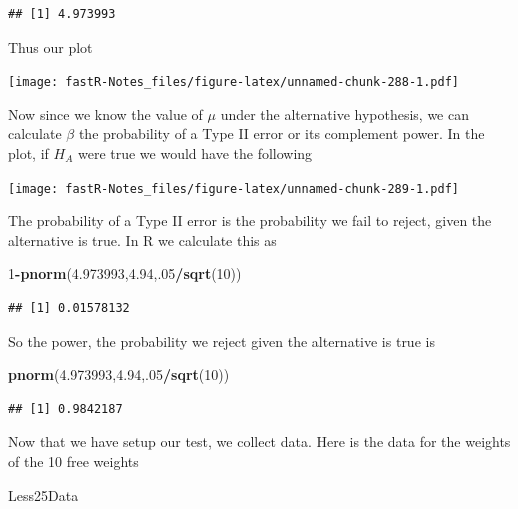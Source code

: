 \documentclass[]{book}
\newenvironment{Shaded}{\begin{snugshade}}{\end{snugshade}}
\newcommand{\KeywordTok}[1]{\textcolor[rgb]{0.13,0.29,0.53}{\textbf{#1}}}
\newcommand{\DecValTok}[1]{\textcolor[rgb]{0.00,0.00,0.81}{#1}}
\newcommand{\FloatTok}[1]{\textcolor[rgb]{0.00,0.00,0.81}{#1}}
\newcommand{\OperatorTok}[1]{\textcolor[rgb]{0.81,0.36,0.00}{\textbf{#1}}}
\newcommand{\NormalTok}[1]{#1}
\theoremstyle{definition}
\theoremstyle{definition}
\theoremstyle{definition}
\theoremstyle{remark}
\begin{document}
\begin{verbatim}
## [1] 4.973993
\end{verbatim}

Thus our plot

\texttt{[image: fastR-Notes\_files/figure-latex/unnamed-chunk-288-1.pdf]}

Now since we know the value of \(\mu\) under the alternative hypothesis,
we can calculate \(\beta\) the probability of a Type II error or its
complement power. In the plot, if \(H_{A}\) were true we would have the
following

\texttt{[image: fastR-Notes\_files/figure-latex/unnamed-chunk-289-1.pdf]}

The probability of a Type II error is the probability we fail to reject,
given the alternative is true. In R we calculate this as

\begin{Shaded}
\begin{Highlighting}[]
\DecValTok{1}\OperatorTok{-}\KeywordTok{pnorm}\NormalTok{(}\FloatTok{4.973993}\NormalTok{,}\FloatTok{4.94}\NormalTok{,.}\DecValTok{05}\OperatorTok{/}\KeywordTok{sqrt}\NormalTok{(}\DecValTok{10}\NormalTok{))}
\end{Highlighting}
\end{Shaded}

\begin{verbatim}
## [1] 0.01578132
\end{verbatim}

So the power, the probability we reject given the alternative is true is

\begin{Shaded}
\begin{Highlighting}[]
\KeywordTok{pnorm}\NormalTok{(}\FloatTok{4.973993}\NormalTok{,}\FloatTok{4.94}\NormalTok{,.}\DecValTok{05}\OperatorTok{/}\KeywordTok{sqrt}\NormalTok{(}\DecValTok{10}\NormalTok{))}
\end{Highlighting}
\end{Shaded}

\begin{verbatim}
## [1] 0.9842187
\end{verbatim}

Now that we have setup our test, we collect data. Here is the data for
the weights of the 10 free weights

\begin{Shaded}
\begin{Highlighting}[]
\NormalTok{Less25Data}
\end{Highlighting}
\end{Shaded}
\end{document}
